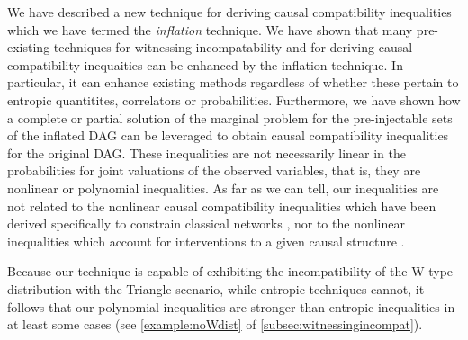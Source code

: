 {We have described a new technique for deriving causal compatibility inequalities which we have termed the {\em inflation} technique.  
We have shown that many pre-existing techniques for witnessing incompatability and for deriving causal compatibility inequaities can be enhanced by the inflation technique.  In particular, it can enhance existing methods regardless of whether these pertain to entropic quantitites, correlators or probabilities.  Furthermore, we have shown how a complete or partial solution of the marginal problem for the pre-injectable sets of the inflated DAG can be leveraged to obtain causal compatibility inequalities  for the original DAG.  These inequalities are not necessarily linear in the probabilities for joint valuations of the observed variables, that is, they are nonlinear or polynomial inequalities.  As far as we can tell, our inequalities are not related to the nonlinear causal compatibility inequalities which have been derived specifically to constrain classical networks \cite{TavakoliStarNetworks,RossetNetworks,TavakoliNoncyclicNetworks}, nor to the nonlinear inequalities which account for interventions to a given causal structure \cite{kang2007polynomialconstraints,steeg2011relaxation}.

Because our technique is capable of exhibiting the incompatibility of the W-type distribution with the Triangle scenario, while entropic techniques cannot, it follows that our polynomial inequalities are stronger than entropic inequalities in at least some cases (see \cref{example:noWdist} of \cref{subsec:witnessingincompat}).   

}
